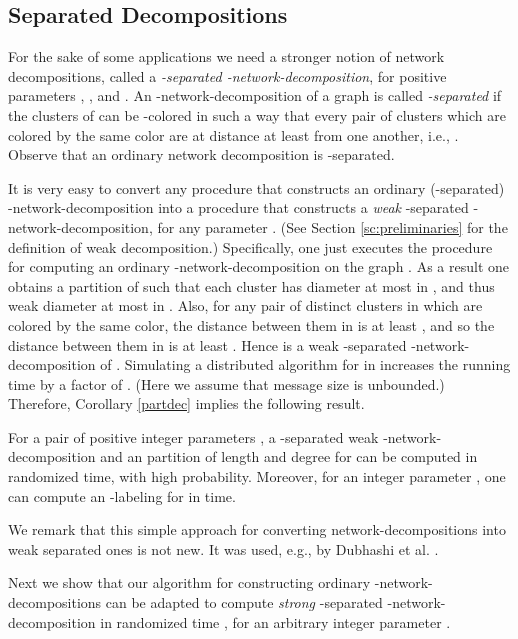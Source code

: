 \documentclass[11pt]{article}
\begin{document}
\subsection{Separated Decompositions} \label{sc:strongdecomp}
For the sake of some applications we need a stronger notion of network decompositions, called a {\em -separated -network-decomposition}, for positive parameters , , and  \cite{ABCP96}. An -network-decomposition  of a graph  is called {\em -separated} if the clusters of  can be -colored in such a way that every pair of clusters  which are colored by the same color are at distance at least  from one another, i.e., . Observe that an ordinary network decomposition is -separated.


It is very easy to convert any procedure that constructs an ordinary (-separated) -network-decomposition into a procedure that constructs a {\em weak} -separated -network-decomposition, for any parameter . (See Section \ref{sc:preliminaries} for the definition of weak decomposition.) Specifically, one just executes the procedure for computing an ordinary -network-decomposition on the graph . As a result one obtains a partition  of  such that each cluster  has diameter at most  in , and thus weak diameter at most   in .
Also, for any pair  of distinct clusters in  which are colored by the same color, the distance between them in  is at least , and so the distance between them in  is at least . Hence  is a weak -separated -network-decomposition of . Simulating a distributed algorithm for  in  increases the running time by a factor of . (Here we assume that message size is unbounded.) Therefore, Corollary \ref{partdec} implies the following result.
\begin{col} \label{sdecpr}
For a pair of positive integer parameters , a -separated weak -network-decomposition  and an  partition  of length  and degree  for  can be computed in randomized  time, with high probability. Moreover, for an integer parameter , one can compute an -labeling for  in  time.
\end{col}
We remark that this simple approach for converting network-decompositions into weak separated ones is not new. It was used, e.g., by Dubhashi et al. \cite{DMPRS05}.

Next we show that our algorithm for constructing ordinary -network-decompositions can be adapted to compute {\em strong} -separated -network-decomposition in randomized time , for an arbitrary integer parameter .
\end{document}
